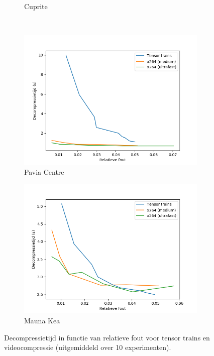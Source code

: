 \begin{figure}[H]
\begin{subfigure}{0.48\textwidth}
  \caption{Cuprite}
\end{subfigure}
\\
\begin{subfigure}{0.48\textwidth}
  \centering
  \includegraphics[width=\linewidth]{images/general_comparison_decompression_times_Pavia_Centre.png}
  \caption{Pavia Centre}
\end{subfigure}
\begin{subfigure}{0.48\textwidth}
  \centering
  \includegraphics[width=\linewidth]{images/general_comparison_decompression_times_Mauna_Kea.png}
  \caption{Mauna Kea}
\end{subfigure}
\caption{Decompressietijd in functie van relatieve fout voor tensor trains en videocompressie (uitgemiddeld over 10 experimenten).}
\label{fig:general-comparison-decompression-times}
\end{figure}

